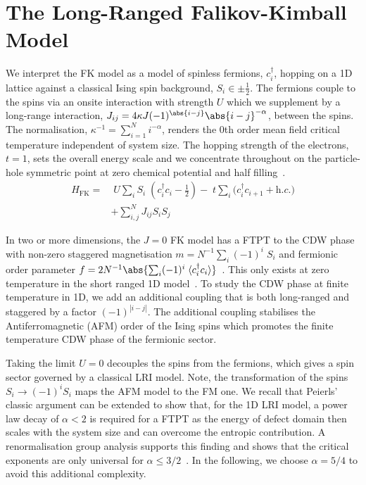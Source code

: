 \hypertarget{the-long-ranged-falikov-kimball-model}{%
\section{The Long-Ranged Falikov-Kimball Model}\label{the-long-ranged-falikov-kimball-model}}

We interpret the FK model as a model of spinless fermions, \(c^\dag_{i}\), hopping on a 1D lattice against a classical Ising spin background, \(S_i \in {\pm \frac{1}{2}}\). The fermions couple to the spins via an onsite interaction with strength \(U\) which we supplement by a long-range interaction, \(J_{ij} = 4\kappa J (-1)^{\abs{i-j}} \abs{i-j}^{-\alpha}\), between the spins. The normalisation, \(\kappa^{-1} = \sum_{i=1}^{N} i^{-\alpha}\), renders the 0th order mean field critical temperature independent of system size. The hopping strength of the electrons, \(t = 1\), sets the overall energy scale and we concentrate throughout on the particle-hole symmetric point at zero chemical potential and half filling~\autocite{gruberFalicovKimballModelReview1996}. ~ \[\begin{aligned}
H_{\mathrm{FK}} = & \;U \sum_{i} S_i\;(c^\dag_{i}c_{i} - \tfrac{1}{2}) -\;t \sum_{i} (c^\dag_{i}c_{i+1} + \textit{h.c.)}\\ 
 &  + \sum_{i, j}^{N} J_{ij}  S_i S_j \nonumber
\label{eq:HFK}\end{aligned}\]

In two or more dimensions, the \(J\!=0\!\) FK model has a FTPT to the CDW phase with non-zero staggered magnetisation \(m = N^{-1} \sum_i (-1)^i \; S_i\) and fermionic order parameter \(f = 2 N^{-1}\abs{\sum_i (-1)^i \; \expval{c^\dag_{i}c_{i}}}\)~\autocite{antipovInteractionTunedAndersonMott2016,maskaThermodynamicsTwodimensionalFalicovKimball2006}. This only exists at zero temperature in the short ranged 1D model~\autocite{kennedyItinerantElectronModel1986}. To study the CDW phase at finite temperature in 1D, we add an additional coupling that is both long-ranged and staggered by a factor \((-1)^{|i-j|}\). The additional coupling stabilises the Antiferromagnetic (AFM) order of the Ising spins which promotes the finite temperature CDW phase of the fermionic sector.

Taking the limit \(U = 0\) decouples the spins from the fermions, which gives a spin sector governed by a classical LRI model. Note, the transformation of the spins \(S_i \to (-1)^{i} S_i\) maps the AFM model to the FM one. We recall that Peierls' classic argument can be extended to show that, for the 1D LRI model, a power law decay of \(\alpha < 2\) is required for a FTPT as the energy of defect domain then scales with the system size and can overcome the entropic contribution. A renormalisation group analysis supports this finding and shows that the critical exponents are only universal for \(\alpha \leq 3/2\)~\autocite{ruelleStatisticalMechanicsOnedimensional1968,thoulessLongRangeOrderOneDimensional1969,angeliniRelationsShortrangeLongrange2014}. In the following, we choose \(\alpha = 5/4\) to avoid this additional complexity.

